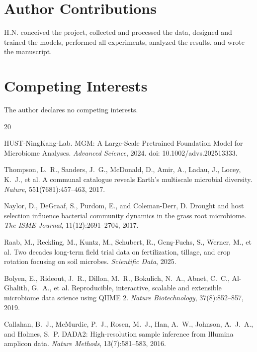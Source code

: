 \documentclass[11pt,a4paper]{article}
\begin{document}
\section*{Author Contributions}

H.N. conceived the project, collected and processed the data, designed and trained the models, performed all experiments, analyzed the results, and wrote the manuscript.

\section*{Competing Interests}

The author declares no competing interests.


\begin{thebibliography}{20}

HUST-NingKang-Lab.
\newblock MGM: A Large-Scale Pretrained Foundation Model for Microbiome Analyses.
\newblock \emph{Advanced Science}, 2024. doi: 10.1002/advs.202513333.

Thompson, L.~R., Sanders, J.~G., McDonald, D., Amir, A., Ladau, J., Locey, K.~J., et al.
\newblock A communal catalogue reveals Earth's multiscale microbial diversity.
\newblock \emph{Nature}, 551(7681):457--463, 2017.

Naylor, D., DeGraaf, S., Purdom, E., and Coleman-Derr, D.
\newblock Drought and host selection influence bacterial community dynamics in the grass root microbiome.
\newblock \emph{The ISME Journal}, 11(12):2691--2704, 2017.

Raab, M., Reckling, M., Kuntz, M., Schubert, R., Gen{\c{s}}-Fuchs, S., Werner, M., et al.
\newblock Two decades long-term field trial data on fertilization, tillage, and crop rotation focusing on soil microbes.
\newblock \emph{Scientific Data}, 2025.

Bolyen, E., Rideout, J.~R., Dillon, M.~R., Bokulich, N.~A., Abnet, C.~C., Al-Ghalith, G.~A., et al.
\newblock Reproducible, interactive, scalable and extensible microbiome data science using QIIME 2.
\newblock \emph{Nature Biotechnology}, 37(8):852--857, 2019.

Callahan, B.~J., McMurdie, P.~J., Rosen, M.~J., Han, A.~W., Johnson, A.~J.~A., and Holmes, S.~P.
\newblock DADA2: High-resolution sample inference from Illumina amplicon data.
\newblock \emph{Nature Methods}, 13(7):581--583, 2016.


\end{thebibliography}
\end{document}
